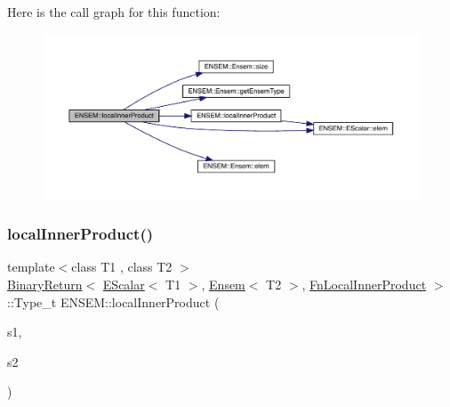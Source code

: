 Here is the call graph for this function\+:\nopagebreak
\begin{figure}[H]
\begin{center}
\leavevmode
\includegraphics[width=350pt]{d1/d9e/group__eensem_gabc088ed28b376f4b542a0fcd1337b609_cgraph}
\end{center}
\end{figure}
\mbox{\label{group__eensem_gad3fbed60bbedae0c1abcbdbfc4bbcc0a}} 
\subsubsection{\texorpdfstring{localInnerProduct()}{localInnerProduct()}\hspace{0.1cm}{\footnotesize\ttfamily [3/3]}}
{\footnotesize\ttfamily template$<$class T1 , class T2 $>$ \\
\mbox{\hyperlink{structENSEM_1_1BinaryReturn}{Binary\+Return}}$<$ \mbox{\hyperlink{classENSEM_1_1EScalar}{E\+Scalar}}$<$ T1 $>$, \mbox{\hyperlink{classENSEM_1_1Ensem}{Ensem}}$<$ T2 $>$, \mbox{\hyperlink{structENSEM_1_1FnLocalInnerProduct}{Fn\+Local\+Inner\+Product}} $>$\+::Type\+\_\+t E\+N\+S\+E\+M\+::local\+Inner\+Product (\begin{DoxyParamCaption}\item[{const \mbox{\hyperlink{classENSEM_1_1EScalar}{E\+Scalar}}$<$ T1 $>$ \&}]{s1,  }\item[{const \mbox{\hyperlink{classENSEM_1_1Ensem}{Ensem}}$<$ T2 $>$ \&}]{s2 }\end{DoxyParamCaption})\hspace{0.3cm}{\ttfamily [inline]}}

